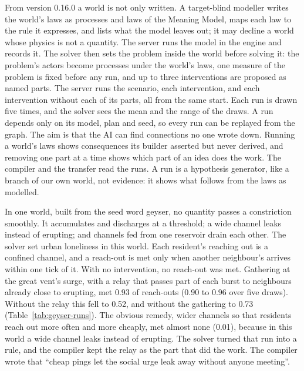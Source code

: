 \documentclass[11pt,a4paper]{article}
\begin{document}
From version 0.16.0 a world is not only written. A target-blind modeller writes
the world's laws as processes and laws of the Meaning Model, maps each law to the
rule it expresses, and lists what the model leaves out; it may decline a world
whose physics is not a quantity. The server runs the model in the engine and
records it. The solver then sets the problem inside the world before solving it:
the problem's actors become processes under the world's laws, one measure of the
problem is fixed before any run, and up to three interventions are proposed as
named parts. The server runs the scenario, each intervention, and each
intervention without each of its parts, all from the same start. Each run is
drawn five times, and the solver sees the mean and the range of the draws. A run
depends only on its model, plan and seed, so every run can be replayed from the
graph. The aim is that the AI can find connections no one wrote down. Running a
world's laws shows consequences its builder asserted but never derived, and
removing one part at a time shows which part of an idea does the work. The
compiler and the transfer read the runs. A run is a hypothesis generator, like a
branch of our own world, not evidence: it shows what follows from the laws as
modelled.

In one world, built from the seed word geyser, no quantity passes a constriction
smoothly. It accumulates and discharges at a threshold; a wide channel leaks
instead of erupting; and channels fed from one reservoir drain each other. The
solver set urban loneliness in this world. Each resident's reaching out is a
confined channel, and a reach-out is met only when another neighbour's arrives
within one tick of it. With no intervention, no reach-out was met. Gathering at
the great vent's surge, with a relay that passes part of each burst to neighbours
already close to erupting, met 0.93 of reach-outs (0.90 to 0.96 over five draws).
Without the relay this fell to 0.52, and without the gathering to 0.73
(Table~\ref{tab:geyser-runs}). The obvious remedy, wider channels so that
residents reach out more often and more cheaply, met almost none (0.01), because
in this world a wide channel leaks instead of erupting. The solver turned that
run into a rule, and the compiler kept the relay as the part that did the work.
The compiler wrote that ``cheap pings let the social urge leak away without anyone
meeting''.
\end{document}
